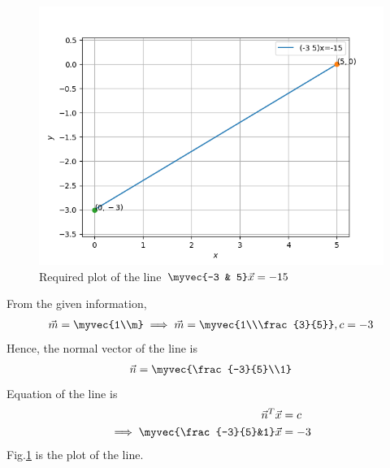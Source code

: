 
\begin{figure}[!ht]
       \centering
        \includegraphics[width =\columnwidth]{line.png}
        \caption{Required plot of the line $\myvec{-3 & 5}\vec{x}=-15$ }
        \label{5/4/fig:Line}
\end{figure}
From the given information, 
\begin{align}
\vec{m}=\myvec{1\\m}\implies\vec{m}=\myvec{1\\\frac{3}{5}},c=-3
\end{align}
Hence, the normal vector of the line is
\begin{align}
\vec{n}=\myvec{\frac{-3}{5}\\1}
\end{align}
Equation of the line is
\begin{align}
\vec{n}^{T}\vec{x}&=c
\\
\implies \myvec{\frac{-3}{5}&1}\vec{x}&=-3
\end{align}
Fig.\ref{5/4/fig:Line} is the plot of the line.


